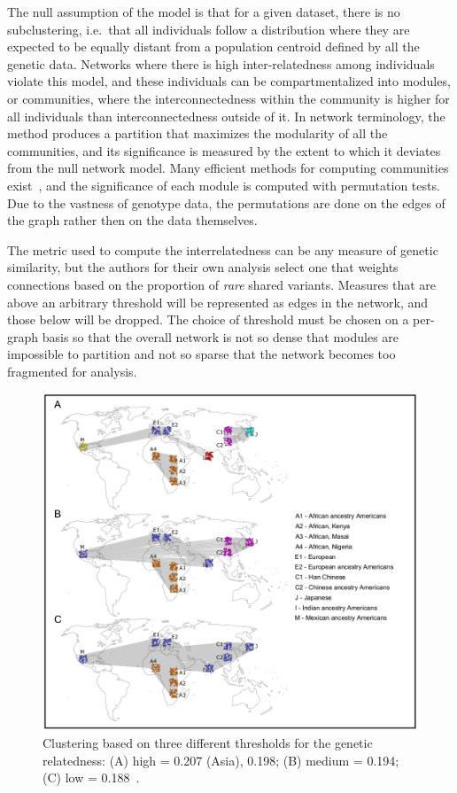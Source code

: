 \documentclass{essay}
\begin{document}
The null assumption of the model is that for a given dataset, there is no
subclustering, i.e.\ that all individuals follow a distribution where they are
expected to be equally distant from a population centroid defined by all the
genetic data. Networks where there is high inter-relatedness among individuals
violate this model, and these individuals can be compartmentalized into
modules, or communities, where the interconnectedness within the community is
higher for all individuals than interconnectedness outside of it. In network
terminology, the method produces a partition that maximizes the modularity of
all the communities, and its significance is measured by the extent to which it
deviates from the null network model. Many efficient methods for computing
communities exist~\cite{newman_modularity_2006}, and the significance of each
module is computed with permutation tests. Due to the vastness of genotype
data, the permutations are done on the edges of the graph rather then on the
data themselves.

The metric used to compute the interrelatedness can be any measure of genetic
similarity, but the authors for their own analysis select one that weights
connections based on the proportion of \textit{rare} shared variants. Measures
that are above an arbitrary threshold will be represented as edges in the
network, and those below will be dropped. The choice of threshold must be
chosen on a per-graph basis so that the overall network is not so dense that
modules are impossible to partition and not so sparse that
the network becomes too fragmented for analysis.

\begin{figure}
  \includegraphics[width=1\linewidth,keepaspectratio]{../Figures/fig11.png}
  \caption{Clustering based on three different thresholds for the genetic
  relatedness: (A) high = 0.207 (Asia), 0.198; (B) medium = 0.194; (C) low =
  0.188~\cite{greenbaum_inference_2016}.}
\end{figure}
\end{document}
